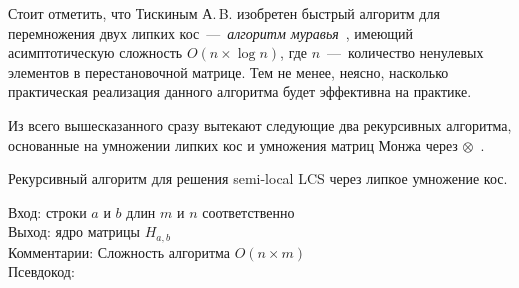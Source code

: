 Стоит отметить, что Тискиным А.\,B. изобретен быстрый алгоритм для перемножения двух липких кос~---~\emph{алгоритм муравья}~\cite{tiskin2015fast}, имеющий асимптотическую сложность $O(n \times \log n)$, где $n$~---~количество ненулевых элементов в перестановочной матрице.
Тем не менее, 
неясно, насколько практическая реализация данного алгоритма будет эффективна на практике.

Из всего вышесказанного сразу вытекают следующие два рекурсивных алгоритма, основанные на умножении липких кос и
умножения матриц Монжа через $\otimes$~\cite{tiskin2008semi}.
 \begin{algorithm}[h]
 \caption{Рекурсивный алгоритм для решения {semi-local LCS} через {липкое умножение кос}.}\label{alg:ant}
 Вход: строки $a$ и $b$ длин $m$ и $n$ соответственно\\
 Выход: ядро  матрицы $H_{a,b}$\\
 Комментарии: Сложность алгоритма $O(n \times m)$\\
 Псевдокод:
 
 \end{algorithm}

